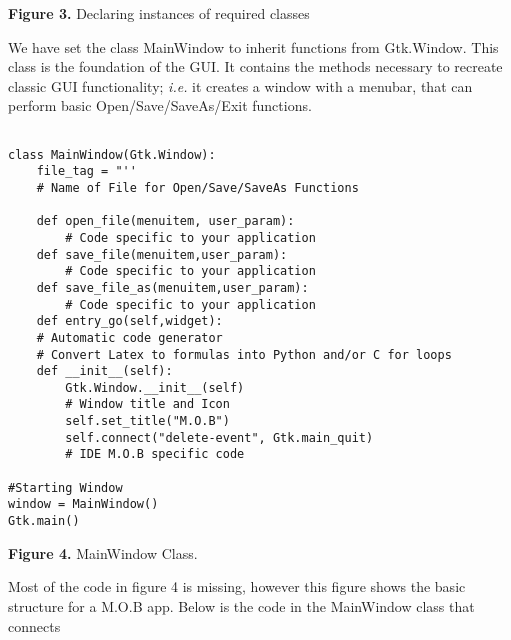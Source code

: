 \documentclass[12pt]{article}
\begin{document}
\vspace{0.3cm}


\textbf{Figure 3.} Declaring instances of required classes


\vspace{0.4cm}

\indent We have set the class MainWindow to inherit functions from Gtk.Window.  This class is the foundation of the GUI.  It contains the methods necessary to recreate classic GUI functionality; \textit{i.e.} it creates a window with a menubar, that can perform basic Open/Save/SaveAs/Exit functions.  


{\footnotesize{
\begin{lstlisting}

class MainWindow(Gtk.Window):
    file_tag = "''		
    # Name of File for Open/Save/SaveAs Functions
   
    def open_file(menuitem, user_param):
    	# Code specific to your application
    def save_file(menuitem,user_param):   
    	# Code specific to your application
    def save_file_as(menuitem,user_param):
    	# Code specific to your application
    def entry_go(self,widget):
	# Automatic code generator
	# Convert Latex to formulas into Python and/or C for loops
    def __init__(self):
        Gtk.Window.__init__(self)
        # Window title and Icon
        self.set_title("M.O.B")
        self.connect("delete-event", Gtk.main_quit)
        # IDE M.O.B specific code
     
#Starting Window
window = MainWindow()
Gtk.main()

\end{lstlisting}

}}

\vspace{0.3cm}


\textbf{Figure 4.} MainWindow Class.  


\vspace{0.3cm}

\indent Most of the code in figure 4 is missing, however this figure shows the basic structure for a M.O.B app.  Below is the code in the MainWindow class that connects

{\footnotesize{
\begin{lstlisting}



\end{lstlisting}
}}
\end{document}
